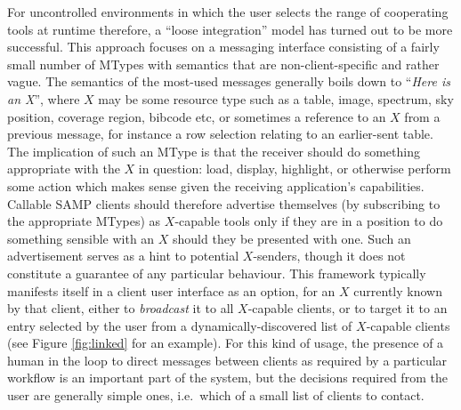 \documentclass[5p]{elsarticle}
\begin{document}
For uncontrolled environments in which the user selects
the range of cooperating tools at runtime therefore,
a ``loose integration'' model has turned out to be more successful.
This approach focuses on a messaging interface
consisting of a fairly small number of MTypes with
semantics that are non-client-specific and rather vague.
The semantics of the most-used messages generally boils down to
``{\em Here is an X}'', where $X$ may be some resource type such as a
table, image, spectrum,
sky position, coverage region, bibcode etc,
or sometimes a reference to an $X$ from a previous message,
for instance a row selection relating to an earlier-sent table.
The implication of such an MType is that the receiver should do
something appropriate with the $X$ in question: load, display, highlight,
or otherwise perform some action which makes sense given the
receiving application's capabilities.
Callable SAMP clients should therefore advertise themselves
(by subscribing to the appropriate MTypes) as $X$-capable
tools only if they are in a position to do something sensible
with an $X$ should they be presented with one.
Such an advertisement serves as a hint to potential $X$-senders,
though it does not constitute a guarantee of any particular behaviour.
This framework typically manifests itself in a client user interface
as an option, for an $X$ currently known by that client,
either to {\em broadcast\/} it to all $X$-capable clients,
or to target it to an entry selected by the user
from a dynamically-discovered list of $X$-capable clients
(see Figure \ref{fig:linked} for an example).
For this kind of usage, the presence of a human in the loop
to direct messages between clients as required by a particular workflow
is an important part of the system,
but the decisions required from the user are generally simple ones,
i.e.\ which of a small list of clients to contact.
\end{document}
